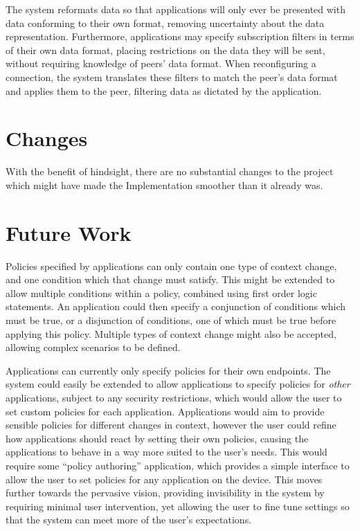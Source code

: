 \documentclass[12pt,twoside,notitlepage]{report}
\begin{document}
The system reformats data so that applications will only ever be presented with data conforming to their own format, removing uncertainty about the data representation. 
Furthermore, applications may specify subscription filters in terms of their own data format, placing restrictions on the data they will be sent, without requiring knowledge of peers' data format.
When reconfiguring a connection, the system translates these filters to match the peer's data format and applies them to the peer, filtering data as dictated by the application.

\section{Changes}
With the benefit of hindsight, there are no substantial changes to the project which might have made the Implementation smoother than it already was. 

\section{Future Work}

Policies specified by applications can only contain one type of context change, and one condition which that change must satisfy. 
This might be extended to allow multiple conditions within a policy, combined using first order logic statements. 
An application could then specify a conjunction of conditions which must be true, or a disjunction of conditions, one of which must be true before applying this policy. 
Multiple types of context change might also be accepted, allowing complex scenarios to be defined. 

Applications can currently only specify policies for their own endpoints. 
The system could easily be extended to allow applications to specify policies for {\sl other} applications, subject to any security restrictions, which would allow the user to set custom policies for each application. 
Applications would aim to provide sensible policies for different changes in context, however the user could refine how applications should react by setting their own policies, causing the applications to behave in a way more suited to the user's needs. 
This would require some ``policy authoring'' application, which provides a simple interface to allow the user to set policies for any application on the device. 
This moves further towards the pervasive vision, providing invisibility \cite{saha2003pervasive} in the system by requiring minimal user intervention, yet allowing the user to fine tune settings so that the system can meet more of the user's expectations. 
\end{document}
